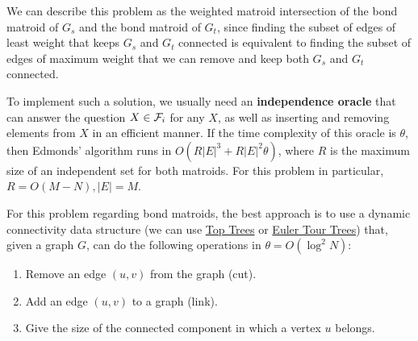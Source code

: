 \documentclass[english,12pt]{article}
\begin{document}
        We can describe this problem as the weighted matroid intersection of the bond matroid of $G_s$ and the bond matroid of $G_t$, since finding the subset of edges of least weight that keeps $G_s$ and $G_t$ connected is equivalent to finding the subset of edges of maximum weight that we can remove and keep both $G_s$ and $G_t$ connected.

        To implement such a solution, we usually need an \textbf{independence oracle} that can answer the question $X \in \mathcal{F}_i$ for any $X$, as well as inserting and removing elements from $X$ in an efficient manner.
        If the time complexity of this oracle is $\theta$, then Edmonds' algorithm runs in $O(R|E|^3 + R|E|^2\theta)$, where $R$ is the maximum size of an independent set for both matroids.
        For this problem in particular, $R = O(M - N), |E| = M$.

        For this problem regarding bond matroids, the best approach is to use a dynamic connectivity data structure (we can use \href{https://codeforces.com/blog/entry/128556}{Top Trees} or \href{https://courses.csail.mit.edu/6.851/spring12/scribe/L20.pdf}{Euler Tour Trees}) that, given a graph $G$, can do the following operations in $\theta = O(\log^2 N)$:
        \begin{enumerate}
            \item Remove an edge $(u, v)$ from the graph (cut).
            \item Add an edge $(u, v)$ to a graph (link).
            \item Give the size of the connected component in which a vertex $u$ belongs.
        \end{enumerate}
\end{document}
